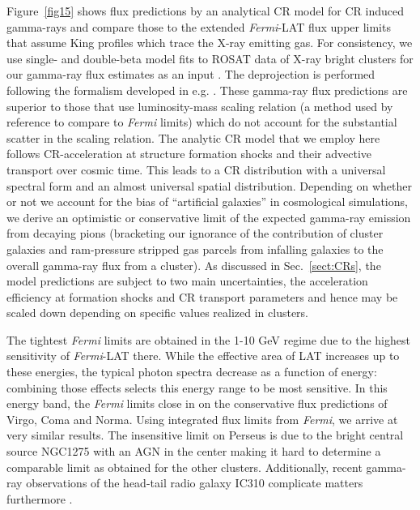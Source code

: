 \documentclass[10pt,aps,pra,reprint,amsmath,amsfonts,amssymb,showpacs,nofootinbib,floatfix]{revtex4-1}
\newcommand{\Fermi}{{\em Fermi}\xspace}
\begin{document}
{Figure~\ref{fig15} shows flux predictions by an analytical CR model
\cite{2010MNRAS.409..449P} for CR induced gamma-rays and compare those
to the extended \Fermi-LAT flux upper limits that assume King profiles
which trace the X-ray emitting gas. For consistency, we use single-
and double-beta model fits to ROSAT data of X-ray bright clusters for
our gamma-ray flux estimates as an input
\cite{2007A&A...466..805C}. The deprojection is performed following
the formalism developed in e.g. \cite{2004A&A...413...17P}. These
gamma-ray flux predictions are superior to those that use
luminosity-mass scaling relation (a method used by reference
\cite{2010ApJ...717L..71A} to compare to \Fermi limits) which do not
account for the substantial scatter in the scaling relation. The
analytic CR model that we employ here follows CR-acceleration at
structure formation shocks and their advective transport over cosmic
time. This leads to a CR distribution with a universal spectral form
and an almost universal spatial distribution. Depending on whether or
not we account for the bias of ``artificial galaxies'' in cosmological
simulations, we derive an optimistic or conservative limit of the
expected gamma-ray emission from decaying pions (bracketing our
ignorance of the contribution of cluster galaxies and ram-pressure
stripped gas parcels from infalling galaxies to the overall gamma-ray
flux from a cluster). As discussed in Sec.~\ref{sect:CRs}, the model
predictions are subject to two main uncertainties, the acceleration
efficiency at formation shocks and CR transport parameters and hence
may be scaled down depending on specific values realized in clusters.

The tightest \Fermi limits are obtained in the 1-10 GeV regime due to
the highest sensitivity of \Fermi-LAT there. While the effective area
of LAT increases up to these energies, the typical photon spectra
decrease as a function of energy: combining those effects selects this
energy range to be most sensitive. In this energy band, the \Fermi
limits close in on the conservative flux predictions of Virgo, Coma
and Norma. Using integrated flux limits from \Fermi, we arrive at very
similar results. The insensitive limit on Perseus is due to the
bright central source NGC1275 with an AGN in the center
\cite{2010ATel.2916....1M} making it hard to determine a comparable
limit as obtained for the other clusters. Additionally, recent
gamma-ray observations of the head-tail radio galaxy IC310 complicate
matters furthermore \cite{2010ApJ...723L.207A,2010A&A...519L...6N}.

}
\end{document}
